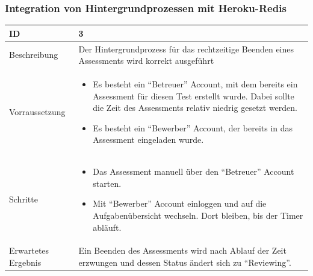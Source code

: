 \subsubsection{Integration von Hintergrundprozessen mit Heroku-Redis}
\begin{tabularx}{\textwidth}[H]{|s|X|}
    \hline
    ID                  & 3                                                                                        \\
    \hline

    Beschreibung        &
    Der Hintergrundprozess für das rechtzeitige Beenden eines Assessments wird korrekt ausgeführt
    \\ \hline

    Vorraussetzung      &
    \begin{itemize}
        \item Es besteht ein \enquote{Betreuer} Account, mit dem bereits ein Assessment für diesen Test erstellt wurde.
              Dabei sollte die Zeit des Assessments relativ niedrig gesetzt werden.
        \item Es besteht ein \enquote{Bewerber} Account, der bereits in das Assessment eingeladen wurde.
    \end{itemize} \\ \hline

    Schritte            &
    \begin{itemize}
        \item Das Assessment manuell über den \enquote{Betreuer} Account starten.
        \item Mit \enquote{Bewerber} Account einloggen und auf die Aufgabenübersicht wechseln. Dort bleiben, bis der Timer abläuft.
    \end{itemize}
    \\ \hline

    Erwartetes Ergebnis &
    Ein Beenden des Assessments wird nach Ablauf der Zeit erzwungen und dessen Status ändert sich zu \enquote{Reviewing}.
    \\ \hline
\end{tabularx}
